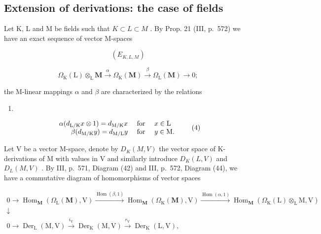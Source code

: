 \subsection{Extension of derivations: the case of fields}

Let K, L and M be fields such that \(K \subset L \subset M\) . By Prop. 21 (III, p.~572) we have an exact sequence of vector M-spaces

\[
(E _ {K, L, M})
\]

\[
\Omega_ {\mathrm{K}} (\mathrm{L}) \otimes_ {\mathrm{L}} \mathbf {M} \xrightarrow {\alpha} \Omega_ {\mathrm{K}} (\mathbf {M}) \xrightarrow {\beta} \Omega_ {\mathrm{L}} (\mathbf {M}) \to 0;
\]

the M-linear mappings \(\alpha\) and \(\beta\) are characterized by the relations

\begin{enumerate}
\def\labelenumi{(\arabic{enumi})}
\setcounter{enumi}{2}
\tightlist
\item
\end{enumerate}

\[
\begin{array}{r l} \alpha (d _ {\mathrm{L/K}} x \otimes 1) = d _ {\mathrm{M/K}} x & \text { for } \quad x \in \mathrm{L} \\ \beta (d _ {\mathrm{M/K}} y) = d _ {\mathrm{M/L}} y & \text { for } \quad y \in \mathrm{M}. \end{array}\tag{4}
\]

Let V be a vector M-space, denote by \(D_{K}(M,V)\) the vector space of K-derivations of M with values in V and similarly introduce \(D_{K}(L,V)\) and \(D_{L}(M,V)\) . By III, p.~571, Diagram (42) and III, p.~572, Diagram (44), we have a commutative diagram of homomorphisms of vector spaces

\[
\begin{array}{l}0 \rightarrow \operatorname{Hom} _ {\mathbf {M}} (\Omega_ {\mathrm{L}} (\mathbf {M}), \mathrm{V}) \xrightarrow {\operatorname{Hom} (\beta , 1)} \operatorname{Hom} _ {\mathbf {M}} (\Omega_ {\mathrm{K}} (\mathbf {M}), \mathrm{V}) \xrightarrow {\operatorname{Hom} (\alpha , 1)} \operatorname{Hom} _ {\mathbf {M}} (\Omega_ {\mathrm{K}} (\mathrm{L}) \otimes_ {\mathrm{L}} \mathrm{M}, \mathrm{V})\\\downarrow\\0 \rightarrow \operatorname{Der} _ {\mathrm{L}} (\mathrm{M}, \mathrm{V}) \xrightarrow {i _ {\mathrm{V}}} \operatorname{Der} _ {\mathrm{K}} (\mathrm{M}, \mathrm{V}) \xrightarrow {r _ {\mathrm{V}}} \operatorname{Der} _ {\mathrm{K}} (\mathrm{L}, \mathrm{V}),\end{array}
\]

